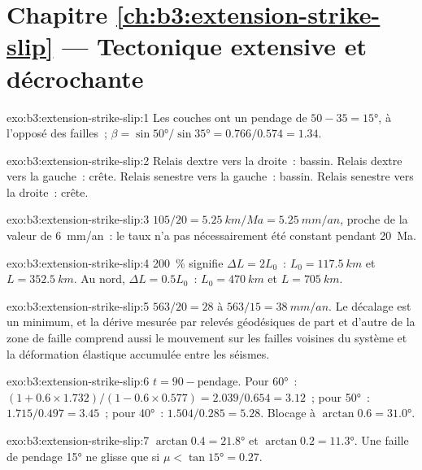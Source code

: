 \section*{Chapitre \ref{ch:b3:extension-strike-slip} --- Tectonique extensive et décrochante}

\begin{solution}{exo:b3:extension-strike-slip:1}
Les couches ont un pendage de $50 - 35 = \ang{15}$, à l'opposé des failles~; $\beta =
\sin\ang{50}/\sin\ang{35} = 0.766/0.574 = 1.34$.
\end{solution}

\begin{solution}{exo:b3:extension-strike-slip:2}
Relais dextre vers la droite~: bassin. Relais dextre vers la gauche~: crête.
Relais senestre vers la gauche~: bassin. Relais senestre vers la droite~: crête.
\end{solution}

\begin{solution}{exo:b3:extension-strike-slip:3}
$105/20 = \qty{5.25}{km/Ma} = \qty{5.25}{mm/an}$, proche de la
valeur de \qty{6}{mm/an}~: le taux n'a pas nécessairement été constant pendant \qty{20}{Ma}.
\end{solution}

\begin{solution}{exo:b3:extension-strike-slip:4}
\qty{200}{\percent} signifie $\Delta L = 2L_0$~: $L_0 = \qty{117.5}{km}$ et $L
= \qty{352.5}{km}$. Au nord, $\Delta L = 0.5L_0$~: $L_0 = \qty{470}{km}$
et $L = \qty{705}{km}$.
\end{solution}

\begin{solution}{exo:b3:extension-strike-slip:5}
$563/20 = 28$ à $563/15 = \qty{38}{mm/an}$. Le décalage est un minimum, et
la dérive mesurée par relevés géodésiques de part et d'autre de la zone de faille comprend aussi le mouvement sur
les failles voisines du système et la déformation élastique accumulée entre
les séismes.
\end{solution}

\begin{solution}{exo:b3:extension-strike-slip:6}
$t = 90 - \text{pendage}$. Pour \ang{60}~: $(1 + 0.6\times1.732)/(1 - 0.6\times
0.577) = 2.039/0.654 = 3.12$~; pour \ang{50}~: $1.715/0.497 = 3.45$~; pour
\ang{40}~: $1.504/0.285 = 5.28$. Blocage à $\arctan0.6 = \ang{31.0}$.
\end{solution}

\begin{solution}{exo:b3:extension-strike-slip:7}
$\arctan0.4 = \ang{21.8}$ et $\arctan0.2 = \ang{11.3}$. Une faille de pendage
\ang{15} ne glisse que si $\mu < \tan\ang{15} = 0.27$.
\end{solution}

